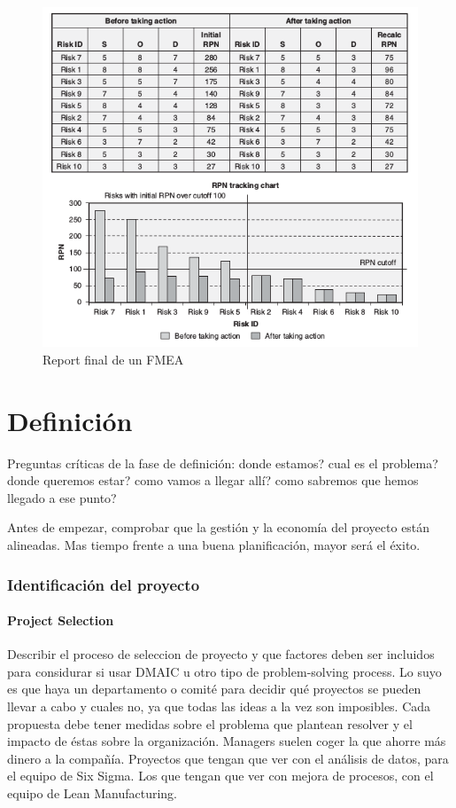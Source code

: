 \documentclass[]{article}
\begin{document}
\begin{figure}[ht!]
	\centering
	\includegraphics[width=140mm]{imagenes/FMEAPrePos.png}
	\caption{Report final de un FMEA}
	\label{fig:FMEAPrePos}
\end{figure}
\pagebreak[4]
\part{Definición}

Preguntas críticas de la fase de definición: donde estamos? cual es el problema? donde queremos estar? como vamos a llegar allí? como sabremos que hemos llegado a ese punto?

Antes de empezar, comprobar que la gestión y la economía del proyecto están alineadas. Mas tiempo frente a una buena planificación, mayor será el éxito. 

\section{Identificación del proyecto}
\subsection{Project Selection}

Describir el proceso de seleccion de proyecto y que factores deben ser incluidos para considurar si usar DMAIC u otro tipo de problem-solving process. Lo suyo es que haya un departamento o comité para decidir qué proyectos se pueden llevar a cabo y cuales no, ya que todas las ideas a la vez son imposibles. Cada propuesta debe tener medidas sobre el problema que plantean resolver y el impacto de éstas sobre la organización. Managers suelen coger la que ahorre más dinero a la compañía.
Proyectos que tengan que ver con el análisis de datos, para el equipo de Six Sigma. Los que tengan que ver con mejora de procesos, con el equipo de Lean Manufacturing.
\end{document}
